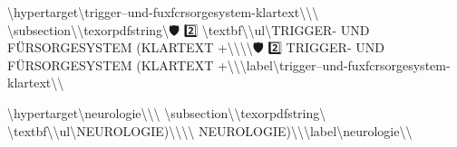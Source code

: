 \textbackslash{}hypertarget\textbackslash{}{trigger--und-fuxfcrsorgesystem-klartext\textbackslash{}}\textbackslash{}{\textbackslash{}%
\textbackslash{}subsection\textbackslash{}{\textbackslash{}texorpdfstring\textbackslash{}{🛡️ 2️⃣ \textbackslash{}textbf\textbackslash{}{\textbackslash{}ul\textbackslash{}{TRIGGER- UND FÜRSORGESYSTEM (KLARTEXT +\textbackslash{}}\textbackslash{}}\textbackslash{}}\textbackslash{}{🛡️ 2️⃣ TRIGGER- UND FÜRSORGESYSTEM (KLARTEXT +\textbackslash{}}\textbackslash{}}\textbackslash{}label\textbackslash{}{trigger--und-fuxfcrsorgesystem-klartext\textbackslash{}}\textbackslash{}}

\textbackslash{}hypertarget\textbackslash{}{neurologie\textbackslash{}}\textbackslash{}{\textbackslash{}%
\textbackslash{}subsection\textbackslash{}{\textbackslash{}texorpdfstring\textbackslash{}{ \textbackslash{}textbf\textbackslash{}{\textbackslash{}ul\textbackslash{}{NEUROLOGIE)\textbackslash{}}\textbackslash{}}\textbackslash{}}\textbackslash{}{ NEUROLOGIE)\textbackslash{}}\textbackslash{}}\textbackslash{}label\textbackslash{}{neurologie\textbackslash{}}\textbackslash{}}


